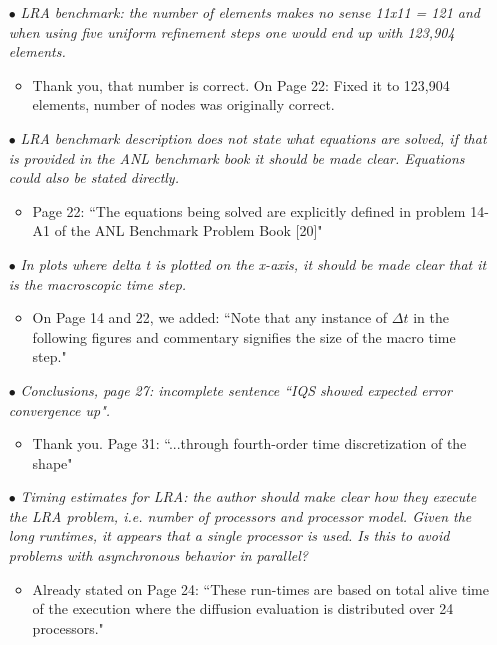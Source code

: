 \documentclass[11pt]{letter}
\newcommand{\nofix}{$\bullet$}
\newcommand{\done}{$\bullet$}
\newcommand{\easy}[1]{{\textit{#1}}}
\begin{document}
\begin{itemize}
\item[\done] \easy{ LRA benchmark: the number of elements makes no sense 11x11 = 121 and when using five uniform refinement steps one would end up with 123,904 elements. }
\begin{itemize}
\item Thank you, that number is correct. On Page 22: Fixed it to 123,904 elements, number of nodes was originally correct. 
\end{itemize}

\item[\done] \easy{ LRA benchmark description does not state what equations are solved, if that is provided in the ANL benchmark book it should be made clear. Equations could also be stated directly. }
\begin{itemize}
\item  Page 22: ``The equations being solved are explicitly defined in problem 14-A1 of the ANL Benchmark Problem Book [20]"
\end{itemize}

\item[\done] \easy{ In plots where delta t is plotted on the x-axis, it should be made clear that it is the macroscopic time step. }
\begin{itemize}
\item On Page 14 and 22, we added: ``Note that any instance of $\Delta t$ in the following figures and commentary signifies the size of the macro time step."
\end{itemize}

\item[\done] \easy{ Conclusions, page 27: incomplete sentence ``IQS showed expected error convergence up". }
\begin{itemize}
\item Thank you. Page 31: ``...through fourth-order time discretization of the shape"
\end{itemize}

\item[\nofix] \easy{ Timing estimates for LRA: the author should make clear how they execute the LRA problem, i.e. number of processors and processor model. Given the long runtimes, it appears that a single processor is used. Is this to avoid problems with asynchronous behavior in parallel? }
\begin{itemize}
\item Already stated on Page 24: ``These run-times are based on total alive time of the execution where the diffusion evaluation is distributed over 24 processors."
\end{itemize}

\end{itemize}
\end{document}
